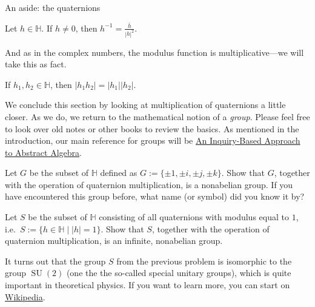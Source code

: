 \begin{section}{An aside: the quaternions}
\begin{theorem}
Let $h\in \mathbb{H}$. If $h\neq 0$, then $h^{-1} = \displaystyle\frac{\overline{h}}{|h|^2}$.
\end{theorem}

And as in the complex numbers, the modulus function is multiplicative---we will take this as fact.

\begin{fact}
If $h_1,h_2\in \mathbb{H}$, then $|h_1h_2| = |h_1||h_2|$.
\end{fact}

We conclude this section by looking at multiplication of quaternions a little closer. As we do, we return to the mathematical notion of a \emph{group}. Please feel free to look over old notes or other books to review the basics. As mentioned in the introduction, our main reference for groups will be  \href{https://github.com/dcernst/IBL-AbstractAlgebra/blob/master/Spring2018/IBL-AbstractAlgebra.pdf}{An Inquiry-Based Approach to Abstract Algebra}.

\begin{problem}
Let $G$ be the subset of $\mathbb{H}$ defined as $G:=\{\pm1,\pm i,\pm j,\pm k\}$. Show that $G$, together with the operation of quaternion multiplication, is a nonabelian group. If you have encountered this group before, what name (or symbol) did you know it by?
\end{problem}

\begin{problem}
Let $S$ be the subset of $\mathbb{H}$ consisting of all quaternions with modulus equal to $1$, i.e.~$S:=\{h\in \mathbb{H}\mid |h| = 1\}$. Show that $S$, together with the operation of quaternion multiplication, is an infinite, nonabelian group.
\end{problem}

It turns out that the group $S$ from the previous problem is isomorphic to the group $\operatorname{SU}(2)$ (one the the so-called special unitary groups), which is quite important in theoretical physics. If you want to learn more, you can start on \href{https://en.wikipedia.org/wiki/Special_unitary_group#The_group_SU(2)}{Wikipedia}.
\end{section}

